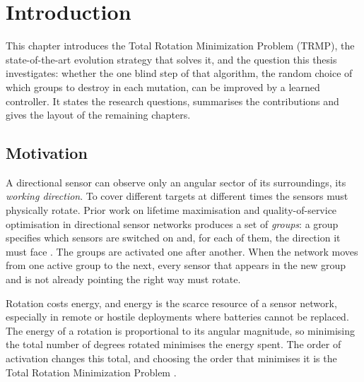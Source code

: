 
\chapter{Introduction} %

\label{Chapter1} %


\newcommand{\keyword}[1]{\textbf{#1}}
\newcommand{\code}[1]{\texttt{#1}}

This chapter introduces the Total Rotation Minimization Problem (TRMP), the state-of-the-art evolution strategy that solves it, and the question this thesis investigates: whether the one blind step of that algorithm, the random choice of which groups to destroy in each mutation, can be improved by a learned controller. It states the research questions, summarises the contributions and gives the layout of the remaining chapters.


\section{Motivation}

A directional sensor can observe only an angular sector of its surroundings, its \emph{working direction}. To cover different targets at different times the sensors must physically rotate. Prior work on lifetime maximisation and quality-of-service optimisation in directional sensor networks produces a set of \emph{groups}: a group specifies which sensors are switched on and, for each of them, the direction it must face \cite{rossi2013}. The groups are activated one after another. When the network moves from one active group to the next, every sensor that appears in the new group and is not already pointing the right way must rotate.

Rotation costs energy, and energy is the scarce resource of a sensor network, especially in remote or hostile deployments where batteries cannot be replaced. The energy of a rotation is proportional to its angular magnitude, so minimising the total number of degrees rotated minimises the energy spent. The order of activation changes this total, and choosing the order that minimises it is the Total Rotation Minimization Problem \cite{singh2015}.

